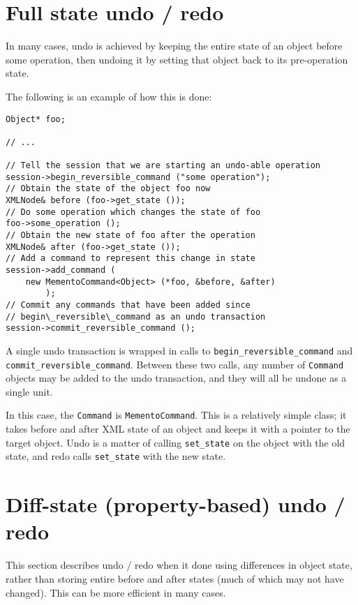\documentclass[10pt,a4paper]{book}
\newcommand{\code}[1]{\texttt{#1}}
\begin{document}
\section{Full state undo / redo}

In many cases, undo is achieved by keeping the entire state of an
object before some operation, then undoing it by setting that object
back to its pre-operation state.

The following is an example of how this is done:

\begin{lstlisting}
Object* foo;

// ...

// Tell the session that we are starting an undo-able operation
session->begin_reversible_command ("some operation");
// Obtain the state of the object foo now
XMLNode& before (foo->get_state ());
// Do some operation which changes the state of foo
foo->some_operation ();
// Obtain the new state of foo after the operation
XMLNode& after (foo->get_state ());
// Add a command to represent this change in state
session->add_command (
	new MementoCommand<Object> (*foo, &before, &after)
        );
// Commit any commands that have been added since
// begin\_reversible\_command as an undo transaction
session->commit_reversible_command ();
\end{lstlisting}

A single undo transaction is wrapped in calls to
\code{begin\_reversible\_command} and
\code{commit\_reversible\_command}.  Between these two calls, any
number of \code{Command} objects may be added to the undo transaction,
and they will all be undone as a single unit.

In this case, the \code{Command} is \code{MementoCommand}.  This is a
relatively simple class; it takes before and after XML state of an
object and keeps it with a pointer to the target object.  Undo is a
matter of calling \code{set\_state} on the object with the old state,
and redo calls \code{set\_state} with the new state.

\section{Diff-state (property-based) undo / redo}

This section describes undo / redo when it done using differences in
object state, rather than storing entire before and after states (much
of which may not have changed).  This can be more efficient in many
cases.
\end{document}
